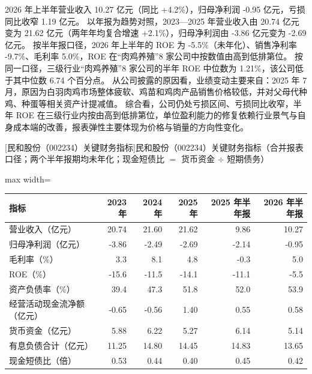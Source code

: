  2026 年上半年营业收入 10.27 亿元（同比 +4.2\%），归母净利润 -0.95 亿元，亏损同比收窄 1.19 亿元。 以年报为趋势对照，2023---2025 年营业收入由 20.74 亿元变为 21.62 亿元（两年年均复合增速 +2.1\%），归母净利润由 -3.86 亿元变为 -2.69 亿元。 按半年报口径，2026 年上半年的 ROE 为 -5.5\%（未年化）、销售净利率 -9.7\%、毛利率 5.0\%，ROE 在“肉鸡养殖”8 家公司中按数值由高到低排第位。 按同一口径，三级行业“肉鸡养殖”8 家公司的半年 ROE 中位数为 1.21\%，该公司低于其中位数 6.74 个百分点。 从公司披露的原因看，业绩变动主要来自：2025 年 7 月，原因为白羽肉鸡市场整体疲软、鸡苗和鸡肉产品销售价格较低，并对父母代种鸡、种蛋等相关资产计提减值。 综合看，公司仍处亏损区间、亏损同比收窄，半年 ROE 在三级行业内按由高到低排第位，单位盈利能力的修复依赖行业景气与自身成本端的改善，报表弹性主要体现为价格与销量的方向性变化。

\begin{center}\small\setlength{\tabcolsep}{3.4pt}
[民和股份（002234）关键财务指标]{民和股份（002234）关键财务指标（合并报表口径；两个半年报期均未年化；现金短债比 $=$ 货币资金 $\div$ 短期债务）}
\begin{adjustbox}{max width=\textwidth}
\begin{tabular}{@{}lrrrrr@{}}
\toprule
指标 & 2023 年 & 2024 年 & 2025 年 & 2025 年半年报 & 2026 年半年报 \\
\midrule
营业收入（亿元） & 20.74 & 21.60 & 21.62 & 9.86 & 10.27 \\
归母净利润（亿元） & -3.86 & -2.49 & -2.69 & -2.14 & -0.95 \\
毛利率（\%） & 3.3 & 8.1 & 4.8 & -0.3 & 5.0 \\
ROE（\%） & -15.6 & -11.5 & -14.1 & -11.1 & -5.5 \\
资产负债率（\%） & 39.4 & 47.3 & 51.8 & 52.0 & 53.9 \\
经营活动现金流净额（亿元） & -0.65 & -0.56 & 1.40 & 0.55 & 0.58 \\
货币资金（亿元） & 5.88 & 6.22 & 5.27 & 6.14 & 5.14 \\
有息负债合计（亿元） & 11.25 & 14.80 & 14.45 & 14.83 & 13.65 \\
现金短债比（倍） & 0.53 & 0.44 & 0.40 & 0.45 & 0.42 \\
\bottomrule
\end{tabular}
\end{adjustbox}
\end{center}

